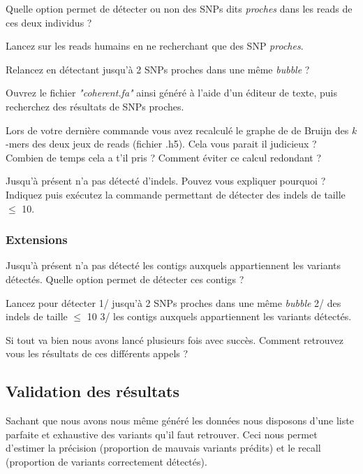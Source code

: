 \qu Quelle option permet  de détecter ou non des SNPs dits \emph{proches} dans les reads de ces deux individus ? 

\qu {} Lancez \discopp sur les reads humains en ne recherchant que des SNP \emph{proches}.

\qu {} Relancez \discopp en détectant jusqu'à 2 SNPs proches dans une même \emph{bubble} ?

\qu Ouvrez le fichier \emph{"coherent.fa"} ainsi généré à l'aide d'un éditeur de texte, puis recherchez des résultats de SNPs proches.

\qu Lors de votre dernière commande vous avez recalculé le graphe de de Bruijn des $k$-mers des deux jeux de reads (fichier .h5). Cela vous parait il judicieux ? Combien de temps cela a t'il pris ? Comment éviter ce calcul redondant ? 


\qu {} Jusqu'à présent \discopp n'a pas détecté d'indels. Pouvez vous expliquer pourquoi ? Indiquez puis exécutez la commande permettant de détecter des indels de taille $\leq$ 10.


\subsubsection*{Extensions}
\qu Jusqu'à présent \discopp n'a pas détecté les contigs auxquels appartiennent les variants détectés. Quelle option permet de détecter ces contigs ? 

\qu Lancez \discopp pour détecter 1/ jusqu'à 2 SNPs proches dans une même \emph{bubble} 2/ des indels de taille $\leq$ 10 3/ les contigs auxquels appartiennent les variants détectés.

\qu Si tout va bien nous avons lancé plusieurs fois \discopp avec succès. Comment retrouvez vous les résultats de ces différents appels ? 

\subsection*{Validation des résultats}
Sachant que nous avons nous même généré les données nous disposons d'une liste parfaite et exhaustive des variants qu'il faut retrouver. Ceci nous permet d'estimer la précision (proportion de mauvais variants prédits) et le recall (proportion de variants correctement détectés).

